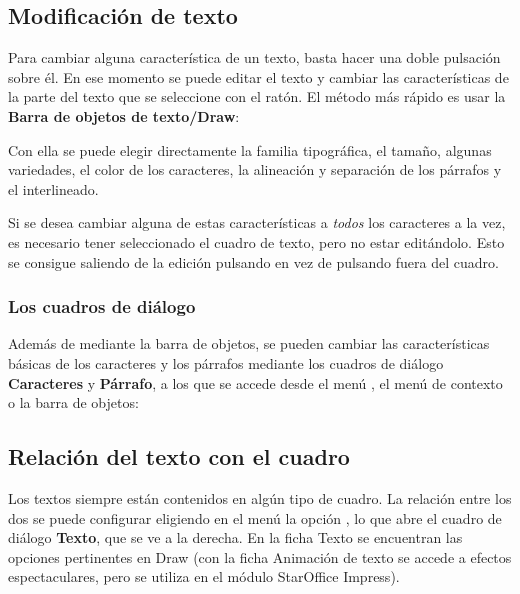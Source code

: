 \subsection{Modificación de texto}

Para cambiar alguna característica de un texto, basta hacer una doble
pulsación sobre él. En ese momento se puede editar el texto y cambiar
las características de la parte del texto que se seleccione con el
ratón. El método más rápido es usar la \textbf{Barra de objetos de
texto/Draw}:

Con ella se puede elegir directamente la familia tipográfica, el
tamaño, algunas variedades, el color de los caracteres, la alineación
y separación de los párrafos y el interlineado.

Si se desea cambiar alguna de estas características a \emph{todos} los
caracteres a la vez, es necesario tener seleccionado el cuadro de
texto, pero no estar editándolo. Esto se consigue saliendo de la
edición pulsando  en vez de pulsando fuera del cuadro.

\subsubsection{Los cuadros de diálogo}

Además de mediante la barra de objetos, se pueden cambiar las
características básicas de los caracteres y los párrafos mediante los
cuadros de diálogo \textbf{Caracteres} y \textbf{Párrafo}, a los que
se accede desde el menú , el menú de contexto o la barra
de objetos:
  
\subsection{Relación del texto con el cuadro}

Los textos siempre están contenidos en algún tipo de cuadro. La
relación entre los dos se puede configurar eligiendo en el menú
 la opción , lo que abre el cuadro de
diálogo \textbf{Texto}, que se ve a la derecha. En la ficha Texto se
encuentran las opciones pertinentes en Draw (con la ficha Animación de
texto se accede a efectos espectaculares, pero se utiliza en el módulo
StarOffice Impress).


